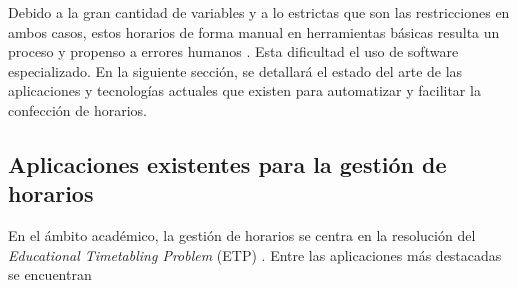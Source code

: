 \documentclass{article}
\begin{document}
Debido a la gran cantidad de variables y a lo estrictas que son las restricciones en ambos casos,  estos horarios de forma manual en herramientas básicas resulta un proceso  y propenso a errores humanos \agregaesto{[REF]}. Esta dificultad  el uso de software especializado. En la siguiente sección, se detallará el estado del arte de las aplicaciones y tecnologías actuales que existen para automatizar y facilitar la confección de horarios.


\subsection{Aplicaciones existentes para la gestión de horarios}
\label{arte}

En el ámbito académico, la gestión de horarios se centra en la resolución del \textit{Educational Timetabling Problem} (ETP) . Entre las aplicaciones más destacadas se encuentran \quitaesto{:}
\end{document}
